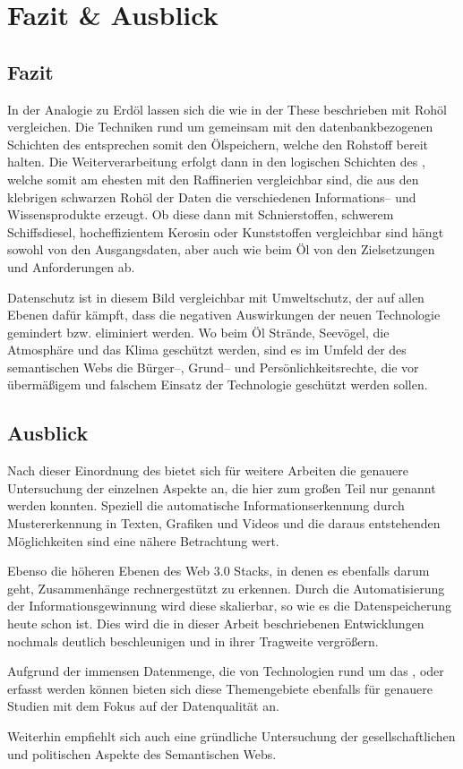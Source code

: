 \section{Fazit \& Ausblick}

\subsection{Fazit}

In der Analogie zu Erdöl lassen sich die  wie in der These beschrieben mit Rohöl vergleichen. Die Techniken rund um  gemeinsam mit den datenbankbezogenen Schichten des  entsprechen somit den Ölspeichern, welche den Rohstoff bereit halten. Die Weiterverarbeitung erfolgt dann in den logischen Schichten des , welche somit am ehesten mit den Raffinerien vergleichbar sind, die aus den klebrigen schwarzen Rohöl der Daten die verschiedenen Informations-- und Wissensprodukte erzeugt. Ob diese dann mit Schnierstoffen, schwerem Schiffsdiesel, hocheffizientem Kerosin oder Kunststoffen vergleichbar sind hängt sowohl von den Ausgangsdaten, aber auch wie beim Öl von den Zielsetzungen und Anforderungen ab.

Datenschutz ist in diesem Bild vergleichbar mit Umweltschutz, der auf allen Ebenen dafür kämpft, dass die negativen Auswirkungen der neuen Technologie gemindert bzw. eliminiert werden. Wo beim Öl Strände, Seevögel, die Atmosphäre und das Klima geschützt werden, sind es  im Umfeld der des semantischen Webs die Bürger--, Grund-- und Persönlichkeitsrechte, die vor übermäßigem und falschem Einsatz der Technologie geschützt werden sollen.

\subsection{Ausblick}
\label{ausblick}

Nach dieser Einordnung des  bietet sich für weitere Arbeiten die genauere Untersuchung der einzelnen Aspekte an, die hier zum großen Teil nur genannt werden konnten. Speziell die automatische Informationserkennung durch Mustererkennung in Texten, Grafiken und Videos und die daraus entstehenden Möglichkeiten sind eine nähere Betrachtung wert. 

Ebenso die höheren Ebenen des Web 3.0 Stacks, in denen es ebenfalls darum geht, Zusammenhänge rechnergestützt zu erkennen. Durch die Automatisierung der Informationsgewinnung wird diese skalierbar, so wie es die Datenspeicherung heute schon ist. Dies wird die in dieser Arbeit beschriebenen Entwicklungen nochmals deutlich beschleunigen und in ihrer Tragweite vergrößern. 

Aufgrund der immensen Datenmenge, die von Technologien rund um das ,  oder  erfasst werden können bieten sich diese Themengebiete ebenfalls für genauere Studien mit dem Fokus auf der Datenqualität an.

Weiterhin empfiehlt sich auch eine gründliche Untersuchung der gesellschaftlichen und politischen Aspekte des Semantischen Webs.